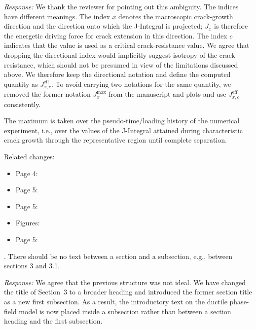 \documentclass[pdflatex,sn-mathphys-num]{sn-jnl}
\begin{document}
\emph{Response:} We thank the reviewer for pointing out this ambiguity. The indices have different meanings. The index $x$ denotes the macroscopic crack-growth direction and the direction onto which the J-Integral is projected; $J_x$ is therefore the energetic driving force for crack extension in this direction. The index $c$ indicates that the value is used as a critical crack-resistance value. We agree that dropping the directional index would implicitly suggest isotropy of the crack resistance, which should not be presumed in view of the limitations discussed above. We therefore keep the directional notation and define the computed quantity as $J_{x,c}^{\mathrm{eff}}$. To avoid carrying two notations for the same quantity, we removed the former notation $J_x^{\mathrm{max}}$ from the manuscript and plots and use $J_{x,c}^{\mathrm{eff}}$ consistently.

The maximum is taken over the pseudo-time/loading history of the numerical experiment, i.e., over the values of the J-Integral attained during characteristic crack growth through the representative region until complete separation.

Related changes:
\begin{itemize}
\item Page 4:  
\item Page 5: 
\item Page 5:  
\item Figures: 
\item Page 5: 
\end{itemize}

\bigskip

. There should be no text between a section and a subsection, e.g., between sections 3 and 3.1.

\emph{Response:} We agree that the previous structure was not ideal. We have changed the title of Section~3 to a broader heading and introduced the former section title as a new first subsection. As a result, the introductory text on the ductile phase-field model is now placed inside a subsection rather than between a section heading and the first subsection.
\end{document}
